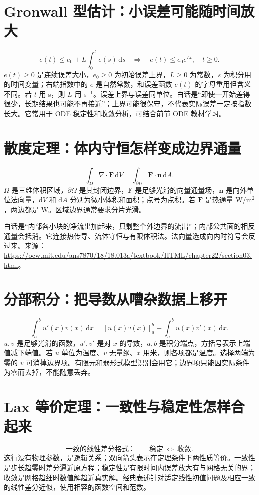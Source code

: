 \documentclass[UTF8,zihao=-4,openany,oneside,fontset=windows]{ctexbook}
\begin{document}
\section{Gronwall 型估计：小误差可能随时间放大}
\begin{equation}e(t)\le e_0+L\int_0^t e(s)\,\mathrm ds\quad\Longrightarrow\quad e(t)\le e_0e^{Lt},\quad t\ge0.\end{equation}
$e(t)\ge0$ 是连续误差大小，$e_0\ge0$ 为初始误差上界，$L\ge0$ 为常数，$s$ 为积分用的时间变量；右端指数中的 $e$ 是自然常数，和误差函数 $e(t)$ 的字母重用但含义不同。若 $t$ 用 s，则 $L$ 用 s$^{-1}$。误差上界与误差同单位。白话是“即使一开始差得很少，长期结果也可能不再接近”；上界可能很保守，不代表实际误差一定按指数长大。它常用于 ODE 稳定性和收敛分析，可结合前节 ODE 教材学习。

\section{散度定理：体内守恒怎样变成边界通量}
\begin{equation}\int_\Omega\nabla\cdot\boldsymbol F\,\mathrm dV=\int_{\partial\Omega}\boldsymbol F\cdot\boldsymbol n\,\mathrm dA.\end{equation}
$\Omega$ 是三维体积区域，$\partial\Omega$ 是其封闭边界，$\boldsymbol F$ 是足够光滑的向量通量场，$\boldsymbol n$ 是向外单位法向量，$\mathrm dV$ 和 $\mathrm dA$ 分别为微小体积和面积；点号为点积。若 $\boldsymbol F$ 是热通量 W/m$^2$，两边都是 W。区域边界通常要求分片光滑。

白话是“内部各小块的净流出加起来，只剩整个外边界的流出”；内部公共面的相反通量会抵消。它连接热传导、流体守恒与有限体积法。法向量选成向内时符号会反过来。来源：\url{https://ocw.mit.edu/ans7870/18/18.013a/textbook/HTML/chapter22/section03.html}。

\section{分部积分：把导数从嘈杂数据上移开}
\begin{equation}\int_a^b u'(x)v(x)\,\mathrm dx=[u(x)v(x)]_a^b-\int_a^b u(x)v'(x)\,\mathrm dx.\end{equation}
$u,v$ 是足够光滑的函数，$u',v'$ 是对 $x$ 的导数，$a,b$ 是积分端点，方括号表示上端值减下端值。若 $u$ 单位为温度、$v$ 无量纲、$x$ 用米，则各项都是温度。选择两端为零的 $v$ 可消掉边界项。有限元和弱形式模型识别会用它；边界项只能因实际条件为零而去掉，不能随意丢弃。

\section{Lax 等价定理：一致性与稳定性怎样合起来}
\begin{equation}\text{一致的线性差分格式：}\qquad \text{稳定}\ \Longleftrightarrow\ \text{收敛}.\end{equation}
这行没有物理参数，是逻辑关系；双向箭头表示在定理条件下两性质等价。一致性是步长趋零时差分逼近原方程；稳定性是有限时间内误差放大有与网格无关的界；收敛是网格趋细时数值解趋近真实解。经典表述针对适定线性初值问题及相应一致的线性差分近似，使用相容的函数空间和范数。
\end{document}
